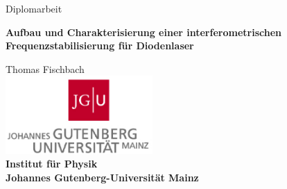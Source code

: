 


\thispagestyle{plain}
\begin{titlepage}
\begin{center}

\vspace*{0.5cm}

\Large{Diplomarbeit}\\

\vspace*{2.2cm}

\fontsize{25pt}{34pt}\selectfont
\bf{Aufbau und Charakterisierung einer interferometrischen Frequenzstabilisierung für Diodenlaser}

\vspace*{1.5cm}

\Large{Thomas Fischbach}\\[5ex]

\vspace*{4.2cm}
\includegraphics[width=0.42\textwidth]{gfx/JGU-Logo.eps}\\
\bf{Institut für Physik}\\
Johannes Gutenberg-Universität Mainz\\
\vspace*{1cm}
\normalsize\mdseries{\today}\\

\end{center}
\end{titlepage}

\tableofcontents
\listoffigures
\listoftables






